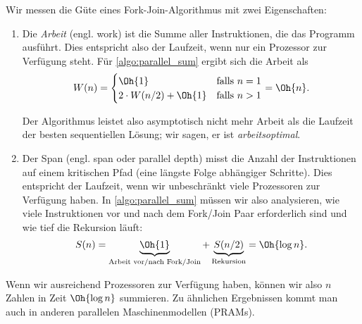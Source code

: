 Wir messen die Güte eines Fork-Join-Algorithmus mit zwei Eigenschaften:
\begin{enumerate}
    \item
          Die  \emph{Arbeit} (engl. work) ist die Summe aller Instruktionen, die das Programm ausführt.
          Dies entspricht also der Laufzeit, wenn nur ein Prozessor zur Verfügung steht.
          Für \cref{algo:parallel_sum} ergibt sich die Arbeit als
          \begin{equation}
              W(n) = \begin{cases}
                  \Oh{1}                  & \text{falls } n = 1 \\
                  2 \cdot W(n/2) + \Oh{1} & \text{falls } n > 1
              \end{cases}
              = \Oh{n}.
          \end{equation}

          Der  Algorithmus leistet also asymptotisch nicht mehr Arbeit als die Laufzeit der besten sequentiellen Lösung; wir sagen, er ist \emph{arbeitsoptimal}.

    \item
          Der  Span (engl. span oder parallel depth) misst die Anzahl der Instruktionen auf einem kritischen Pfad (\dh eine längste Folge abhängiger Schritte).
          Dies entspricht der Laufzeit, wenn wir unbeschränkt viele Prozessoren zur Verfügung haben.
          In \cref{algo:parallel_sum} müssen wir also analysieren, wie viele Instruktionen vor und nach dem Fork/Join Paar erforderlich sind und wie tief die Rekursion läuft:
          \begin{equation}
              S(n) = \underbrace{\Oh{1}}_\text{Arbeit vor/nach Fork/Join} + \underbrace{S(n/2)}_\text{Rekursion} = \Oh{\log n}.
          \end{equation}
\end{enumerate}

Wenn wir ausreichend Prozessoren zur Verfügung haben, können wir also $n$ Zahlen in Zeit $\Oh{\log n}$ summieren.
Zu ähnlichen Ergebnissen kommt man auch in anderen parallelen Maschinenmodellen (\zB PRAMs).

